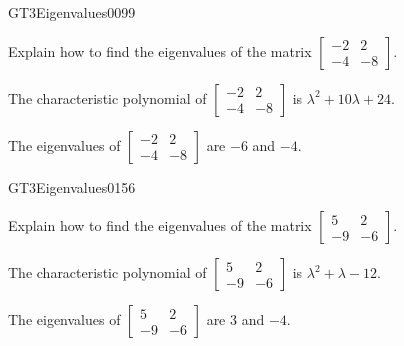 \newpage




\begin{exercise}{GT3}{Eigenvalues}{0099} 
\begin{exerciseStatement} 

Explain how to find the eigenvalues of the matrix \(\left[\begin{array}{cc}
-2 & 2 \\
-4 & -8
\end{array}\right]\).

 \end{exerciseStatement}
 \begin{exerciseAnswer} 

The characteristic polynomial of \(\left[\begin{array}{cc}
-2 & 2 \\
-4 & -8
\end{array}\right]\) is \(\lambda^{2} + 10 \lambda + 24\).

 

The eigenvalues of \(\left[\begin{array}{cc}
-2 & 2 \\
-4 & -8
\end{array}\right]\) are \(-6\) and \(-4\).

 \end{exerciseAnswer}
 \end{exercise}



\begin{exercise}{GT3}{Eigenvalues}{0156} 
\begin{exerciseStatement} 

Explain how to find the eigenvalues of the matrix \(\left[\begin{array}{cc}
5 & 2 \\
-9 & -6
\end{array}\right]\).

 \end{exerciseStatement}
 \begin{exerciseAnswer} 

The characteristic polynomial of \(\left[\begin{array}{cc}
5 & 2 \\
-9 & -6
\end{array}\right]\) is \(\lambda^{2} + \lambda - 12\).

 

The eigenvalues of \(\left[\begin{array}{cc}
5 & 2 \\
-9 & -6
\end{array}\right]\) are \(3\) and \(-4\).

 \end{exerciseAnswer}
 \end{exercise}


